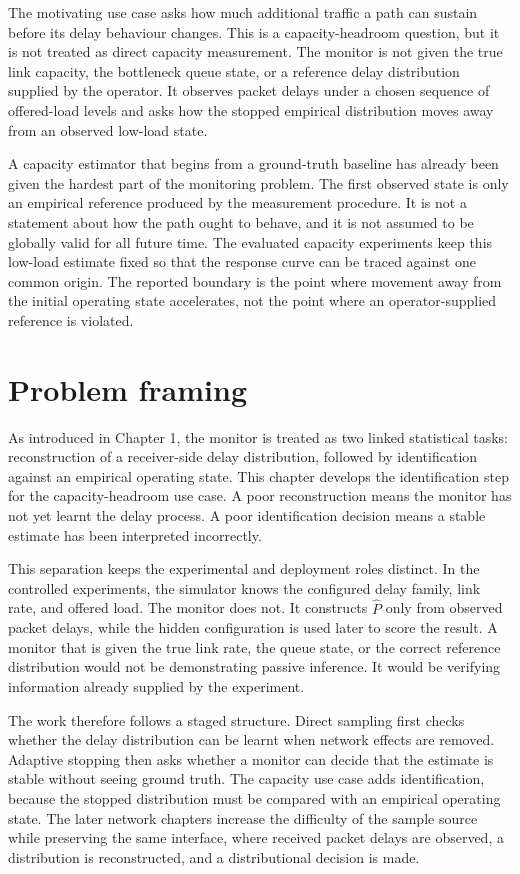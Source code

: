 The motivating use case asks how much additional traffic a path can sustain before its delay behaviour changes. This is a capacity-headroom question, but it is not treated as direct capacity measurement. The monitor is not given the true link capacity, the bottleneck queue state, or a reference delay distribution supplied by the operator. It observes packet delays under a chosen sequence of offered-load levels and asks how the stopped empirical distribution moves away from an observed low-load state.

A capacity estimator that begins from a ground-truth baseline has already been given the hardest part of the monitoring problem. The first observed state is only an empirical reference produced by the measurement procedure. It is not a statement about how the path ought to behave, and it is not assumed to be globally valid for all future time. The evaluated capacity experiments keep this low-load estimate fixed so that the response curve can be traced against one common origin. The reported boundary is the point where movement away from the initial operating state accelerates, not the point where an operator-supplied reference is violated.

\section{Problem framing}

As introduced in Chapter 1, the monitor is treated as two linked statistical tasks: reconstruction of a receiver-side delay distribution, followed by identification against an empirical operating state. This chapter develops the identification step for the capacity-headroom use case. A poor reconstruction means the monitor has not yet learnt the delay process. A poor identification decision means a stable estimate has been interpreted incorrectly.

This separation keeps the experimental and deployment roles distinct. In the controlled experiments, the simulator knows the configured delay family, link rate, and offered load. The monitor does not. It constructs \(\widehat{P}\) only from observed packet delays, while the hidden configuration is used later to score the result. A monitor that is given the true link rate, the queue state, or the correct reference distribution would not be demonstrating passive inference. It would be verifying information already supplied by the experiment.

The work therefore follows a staged structure. Direct sampling first checks whether the delay distribution can be learnt when network effects are removed. Adaptive stopping then asks whether a monitor can decide that the estimate is stable without seeing ground truth. The capacity use case adds identification, because the stopped distribution must be compared with an empirical operating state. The later network chapters increase the difficulty of the sample source while preserving the same interface, where received packet delays are observed, a distribution is reconstructed, and a distributional decision is made.

